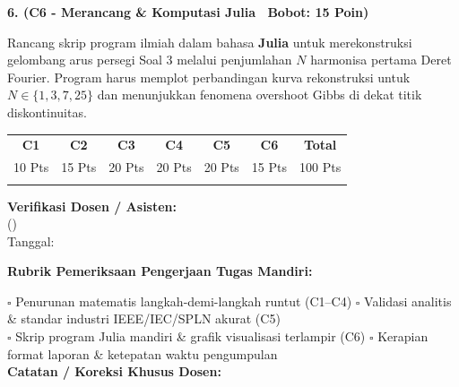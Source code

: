 \documentclass[10pt,a4paper]{article}
\begin{document}
\vspace{3.5mm}

\noindent\textbf{6. (C6 - Merancang \& Komputasi Julia \textbar\ Bobot: 15 Poin)}\par\vspace{0.8mm}
{\footnotesize Rancang skrip program ilmiah dalam bahasa \textbf{Julia} untuk merekonstruksi gelombang arus persegi Soal 3 melalui penjumlahan $N$ harmonisa pertama Deret Fourier. Program harus memplot perbandingan kurva rekonstruksi untuk $N \in \{1, 3, 7, 25\}$ dan menunjukkan fenomena overshoot Gibbs di dekat titik diskontinuitas.}\par

\vfill

\noindent\begin{minipage}[b]{0.62\textwidth}%
  \centering
  \scriptsize
  \begin{tabular}{|c|c|c|c|c|c|c|}
    \hline
    \rowcolor{unibblue}
    \textbf{\color{white}C1} & \textbf{\color{white}C2} & \textbf{\color{white}C3} & \textbf{\color{white}C4} & \textbf{\color{white}C5} & \textbf{\color{white}C6} & \textbf{\color{white}Total} \\
    \rowcolor{unibblue!10}
    10 Pts & 15 Pts & 20 Pts & 20 Pts & 20 Pts & 15 Pts & 100 Pts \\
    \hline
    & & & & & & \\[3mm]
    \hline
  \end{tabular}%
\end{minipage}%
\hfill%
\begin{minipage}[b]{0.35\textwidth}%
  \centering
  \scriptsize
  \textbf{Verifikasi Dosen / Asisten:}\\[6mm]
  (\dotfill)\\[1mm]
  \tiny Tanggal: \dotfill
\end{minipage}\par

\vspace{2mm}
\begin{tcolorbox}[colback=white,colframe=unibblue!40!black,colbacktitle=unibblue!10,coltitle=unibblue,boxrule=0.5pt,arc=2pt,left=5pt,right=5pt,top=3pt,bottom=3pt,title=\textbf{\tiny Catatan Evaluasi \& Umpan Balik Dosen Pengampu}]
  \tiny
  \textbf{Rubrik Pemeriksaan Pengerjaan Tugas Mandiri:}\par\vspace{0.8mm}
  $\square$ Penurunan matematis langkah-demi-langkah runtut (C1--C4) \hfill $\square$ Validasi analitis \& standar industri IEEE/IEC/SPLN akurat (C5)\\[0.8mm]
  $\square$ Skrip program Julia mandiri \& grafik visualisasi terlampir (C6) \hfill $\square$ Kerapian format laporan \& ketepatan waktu pengumpulan\\[2.0mm]
  \textbf{Catatan / Koreksi Khusus Dosen:}\\[1.6cm]
\end{tcolorbox}
\end{document}
